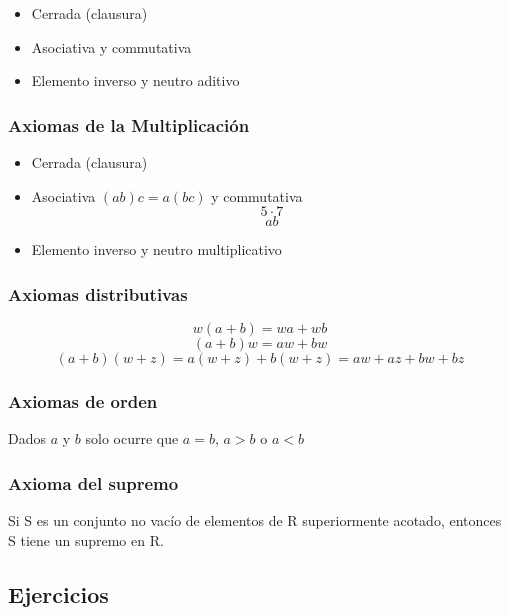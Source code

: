 \documentclass[
  16pt,
]{krantz}
\providecommand{\tightlist}{%
  \setlength{\itemsep}{0pt}\setlength{\parskip}{0pt}}
\theoremstyle{definition}
\theoremstyle{definition}
\theoremstyle{definition}
\theoremstyle{definition}
\theoremstyle{remark}
\begin{document}
\begin{itemize}
\tightlist
\item
  Cerrada (clausura)
\item
  Asociativa y commutativa
\item
  Elemento inverso y neutro aditivo
\end{itemize}

\hypertarget{axiomas-de-la-multiplicaciuxf3n}{%
\subsubsection{Axiomas de la Multiplicación}\label{axiomas-de-la-multiplicaciuxf3n}}

\begin{itemize}
\tightlist
\item
  Cerrada (clausura)
\item
  Asociativa \((ab)c=a(bc)\) y commutativa
  \[5\cdot7\]
  \[ab\]
\item
  Elemento inverso y neutro multiplicativo
\end{itemize}

\hypertarget{axiomas-distributivas}{%
\subsubsection{Axiomas distributivas}\label{axiomas-distributivas}}

\[w(a+b)=wa+wb\]
\[(a+b)w=aw+bw\]
\[(a+b)(w+z)=a(w+z)+b(w+z)=aw+az+bw+bz\]

\hypertarget{axiomas-de-orden}{%
\subsubsection{Axiomas de orden}\label{axiomas-de-orden}}

Dados \(a\) y \(b\) solo ocurre que \(a=b\), \(a>b\) o \(a<b\)

\hypertarget{axioma-del-supremo}{%
\subsubsection{Axioma del supremo}\label{axioma-del-supremo}}

Si S es un conjunto no vacío de elementos de R superiormente acotado,
entonces S tiene un supremo en R.

\hypertarget{ejercicios-1}{%
\subsection{Ejercicios}\label{ejercicios-1}}
\end{document}
